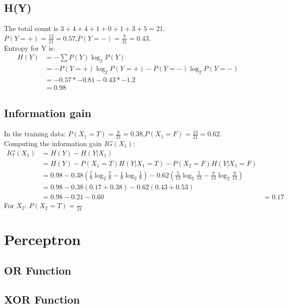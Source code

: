 \documentclass{article}
\begin{document}
\subsection{H(Y)}
The total count is $3+4+4+1+0+1+3+5=21$. \\
$P(Y=+)=\frac{12}{21}=0.57$,$P(Y=-)=\frac{9}{21}=0.43$.\\
Entropy for Y is:\\
\begin{align*}
H(Y)&=-\sum P(Y)\log_2 P(Y)\\
	 &=-P(Y=+)\log_2 P(Y=+)-P(Y=-)\log_2 P(Y=-)\\
	 &=-0.57*-0.81-0.43*-1.2\\
	 &=0.98
\end{align*}

\subsection{Information gain}
In the training data: $P(X_1=T)=\frac{8}{21}=0.38$,$P(X_1=F)=\frac{13}{21}=0.62$.\\
Computing the information gain $IG(X_1)$:\\
\begin{align*}
IG(X_1)&=H(Y)-H(Y|X_1)\\
		&=H(Y)-P(X_1=T)H(Y|X_1=T)-P(X_2=F)H(Y|X_1=F)\\
		&=0.98-0.38({\frac{7}{8}\log_2 \frac{7}{8}}-{\frac{1}{8}\log_2 \frac{1}{8}})-0.62({\frac{5}{13}\log_2 \frac{5}{13}}-{\frac{8}{13}\log_2 \frac{8}{13}})\\
		&=0.98-0.38(0.17+0.38)-0.62(0.43+0.53)\\
		&=0.98-0.21-0.60
		&=0.17
\end{align*}
For $X_2$: $P(X_2=T)=\frac{}{21}$



\section{Perceptron}
\subsection{OR Function}
\subsection{XOR Function}
\end{document}
